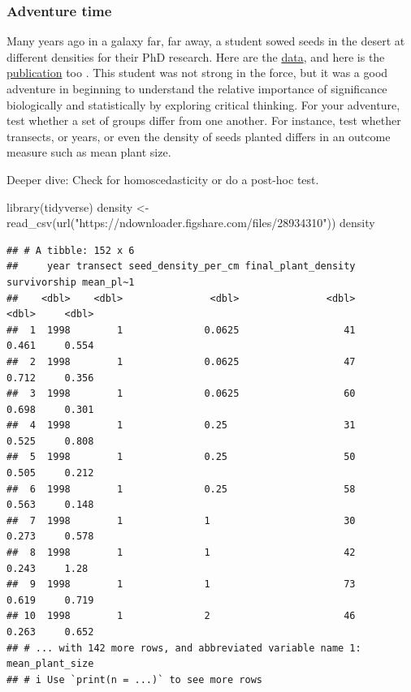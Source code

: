 \documentclass[
]{book}
\newenvironment{Shaded}{\begin{snugshade}}{\end{snugshade}}
\newcommand{\FunctionTok}[1]{\textcolor[rgb]{0.00,0.00,0.00}{#1}}
\newcommand{\NormalTok}[1]{#1}
\newcommand{\OtherTok}[1]{\textcolor[rgb]{0.56,0.35,0.01}{#1}}
\newcommand{\StringTok}[1]{\textcolor[rgb]{0.31,0.60,0.02}{#1}}
\begin{document}
\hypertarget{adventure-time-1}{%
\subsubsection*{Adventure time}\label{adventure-time-1}}

Many years ago in a galaxy far, far away, a student sowed seeds in the desert at different densities for their PhD research. Here are the \href{https://figshare.com/articles/dataset/Density_experiment_in_Negev_Desert_Israel/669703}{data}, and here is the \href{https://besjournals.onlinelibrary.wiley.com/doi/10.1046/j.1365-2745.2002.00686.x}{publication} too \citep{RN3094}. This student was not strong in the force, but it was a good adventure in beginning to understand the relative importance of significance biologically and statistically by exploring critical thinking. For your adventure, test whether a set of groups differ from one another. For instance, test whether transects, or years, or even the density of seeds planted differs in an outcome measure such as mean plant size.

Deeper dive: Check for homoscedasticity or do a post-hoc test.

\begin{Shaded}
\begin{Highlighting}[]
\FunctionTok{library}\NormalTok{(tidyverse)}
\NormalTok{density }\OtherTok{\textless{}{-}} \FunctionTok{read\_csv}\NormalTok{(}\FunctionTok{url}\NormalTok{(}\StringTok{"https://ndownloader.figshare.com/files/28934310"}\NormalTok{))}
\NormalTok{density}
\end{Highlighting}
\end{Shaded}

\begin{verbatim}
## # A tibble: 152 x 6
##     year transect seed_density_per_cm final_plant_density survivorship mean_pl~1
##    <dbl>    <dbl>               <dbl>               <dbl>        <dbl>     <dbl>
##  1  1998        1              0.0625                  41        0.461     0.554
##  2  1998        1              0.0625                  47        0.712     0.356
##  3  1998        1              0.0625                  60        0.698     0.301
##  4  1998        1              0.25                    31        0.525     0.808
##  5  1998        1              0.25                    50        0.505     0.212
##  6  1998        1              0.25                    58        0.563     0.148
##  7  1998        1              1                       30        0.273     0.578
##  8  1998        1              1                       42        0.243     1.28 
##  9  1998        1              1                       73        0.619     0.719
## 10  1998        1              2                       46        0.263     0.652
## # ... with 142 more rows, and abbreviated variable name 1: mean_plant_size
## # i Use `print(n = ...)` to see more rows
\end{verbatim}
\end{document}
